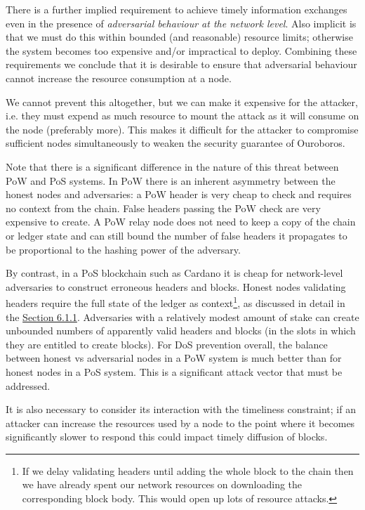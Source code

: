 \documentclass[]{article}
\begin{document}
There is a further implied requirement to achieve timely information
exchanges even in the presence of \emph{adversarial behaviour at the
network level}. Also implicit is that we must do this within bounded
(and reasonable) resource limits; otherwise the system becomes too
expensive and/or impractical to deploy. Combining these requirements we
conclude that it is desirable to ensure that adversarial behaviour
cannot increase the resource consumption at a node.

We cannot prevent this altogether, but we can make it expensive for the
attacker, i.e. they must expend as much resource to mount the attack as
it will consume on the node (preferably more). This makes it difficult
for the attacker to compromise sufficient nodes simultaneously to weaken
the security guarantee of Ouroboros.

Note that there is a significant difference in the nature of this threat
between PoW and PoS systems. In PoW there is an inherent asymmetry
between the honest nodes and adversaries: a PoW header is very cheap to
check and requires no context from the chain. False headers passing the
PoW check are very expensive to create. A PoW relay node does not need
to keep a copy of the chain or ledger state and can still bound the
number of false headers it propagates to be proportional to the hashing
power of the adversary.

By contrast, in a PoS blockchain such as Cardano it is cheap for
network-level adversaries to construct erroneous headers and blocks.
Honest nodes validating headers require the full state of the ledger as
context\footnote{If we delay validating headers until adding the whole
  block to the chain then we have already spent our network resources on
  downloading the corresponding block body. This would open up lots of
  resource attacks.}, as discussed in detail in the
\protect\hyperlink{interleaving-transmission-and-validation}{{Section
6.1.1}}. Adversaries with a relatively modest amount of stake can create
unbounded numbers of apparently valid headers and blocks (in the slots
in which they are entitled to create blocks). For DoS prevention
overall, the balance between honest vs adversarial nodes in a PoW system
is much better than for honest nodes in a PoS system. This is a
significant attack vector that must be addressed.

It is also necessary to consider its interaction with the timeliness
constraint; if an attacker can increase the resources used by a node to
the point where it becomes significantly slower to respond this could
impact timely diffusion of blocks.
\end{document}
